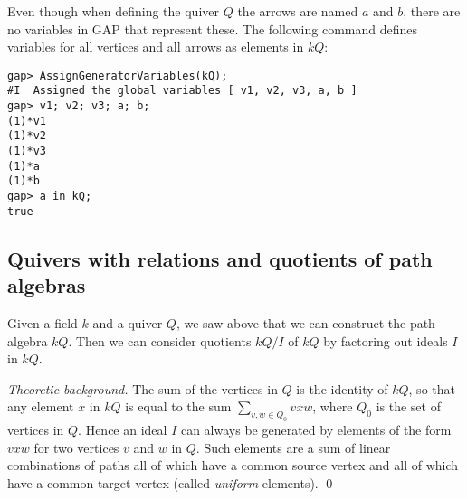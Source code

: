\documentclass{amsart}
\theoremstyle{definition}
\theoremstyle{theoretic}
\newenvironment{theoback}
{\medskip\footnotesize\textit{Theoretic background.} }
{\qed\par\medskip}
\begin{document}
Even though when defining the quiver $Q$ the arrows are named $a$ and
$b$, there are no variables in GAP that represent these.  The
following command defines variables for all vertices and all
arrows as elements in $kQ$:
\begin{verbatim}
gap> AssignGeneratorVariables(kQ);
#I  Assigned the global variables [ v1, v2, v3, a, b ]
gap> v1; v2; v3; a; b;
(1)*v1
(1)*v2
(1)*v3
(1)*a
(1)*b
gap> a in kQ;
true
\end{verbatim}

\subsection{Quivers with relations and quotients of path algebras}

Given a field $k$ and a quiver $Q$, we saw above that we can construct
the path algebra $kQ$.  Then we can consider quotients $kQ/I$ of $kQ$
by factoring out ideals $I$ in $kQ$.  


\begin{theoback} The sum of the vertices in $Q$
is the identity of $kQ$, so that any element $x$ in $kQ$ is equal to
the sum $\sum_{v,w\in Q_0} vxw$, where $Q_0$ is the set of vertices in
$Q$.  Hence an ideal $I$ can always be generated by elements of the
form $vxw$ for two vertices $v$ and $w$ in $Q$.  Such elements are a
sum of linear combinations of paths all of which have a common source
vertex and all of which have a common target vertex (called
\emph{uniform} elements).
\end{theoback}
\end{document}
